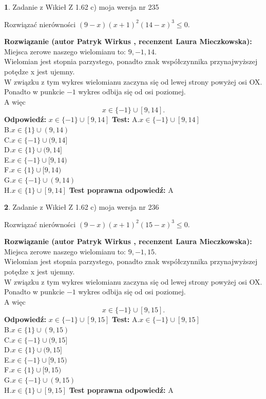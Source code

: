 \documentclass[12pt, a4paper]{article}
\theoremstyle{definition} %
\newtheorem{zad}{}
\newcommand{\zadStart}[1]{\begin{zad}#1\newline}
\newcommand{\zadStop}{\end{zad}}
\newcommand{\rozwStart}[2]{\noindent \textbf{Rozwiązanie (autor #1 , recenzent #2): }\newline}
\newcommand{\rozwStop}{\newline}
\newcommand{\odpStart}{\noindent \textbf{Odpowiedź:}\newline}
\newcommand{\odpStop}{\newline}
\newcommand{\testStart}{\noindent \textbf{Test:}\newline}
\newcommand{\testStop}{\newline}
\newcommand{\kluczStart}{\noindent \textbf{Test poprawna odpowiedź:}\newline}
\newcommand{\kluczStop}{\newline}
\begin{document}
\zadStart{Zadanie z Wikieł Z 1.62 c) moja wersja nr 235}

Rozwiązać nierówności $(9-x)(x+1)^{2}(14-x)^{3}\le0$.
\zadStop
\rozwStart{Patryk Wirkus}{Laura Mieczkowska}
Miejsca zerowe naszego wielomianu to: $9, -1, 14$.\\
Wielomian jest stopnia parzystego, ponadto znak współczynnika przy\linebreak najwyższej potędze x jest ujemny.\\ W związku z tym wykres wielomianu zaczyna się od lewej strony powyżej osi OX.\\
Ponadto w punkcie $-1$ wykres odbija się od osi poziomej.\\
A więc $$x \in \{-1\} \cup [9,14].$$
\rozwStop
\odpStart
$x \in \{-1\} \cup [9,14]$
\odpStop
\testStart
A.$x \in \{-1\} \cup [9,14]$\\
B.$x \in \{1\} \cup (9,14)$\\
C.$x \in \{-1\} \cup (9,14]$\\
D.$x \in \{1\} \cup (9,14]$\\
E.$x \in \{-1\} \cup [9,14)$\\
F.$x \in \{1\} \cup [9,14)$\\
G.$x \in \{-1\} \cup (9,14)$\\
H.$x \in \{1\} \cup [9,14]$
\testStop
\kluczStart
A
\kluczStop



\zadStart{Zadanie z Wikieł Z 1.62 c) moja wersja nr 236}

Rozwiązać nierówności $(9-x)(x+1)^{2}(15-x)^{3}\le0$.
\zadStop
\rozwStart{Patryk Wirkus}{Laura Mieczkowska}
Miejsca zerowe naszego wielomianu to: $9, -1, 15$.\\
Wielomian jest stopnia parzystego, ponadto znak współczynnika przy\linebreak najwyższej potędze x jest ujemny.\\ W związku z tym wykres wielomianu zaczyna się od lewej strony powyżej osi OX.\\
Ponadto w punkcie $-1$ wykres odbija się od osi poziomej.\\
A więc $$x \in \{-1\} \cup [9,15].$$
\rozwStop
\odpStart
$x \in \{-1\} \cup [9,15]$
\odpStop
\testStart
A.$x \in \{-1\} \cup [9,15]$\\
B.$x \in \{1\} \cup (9,15)$\\
C.$x \in \{-1\} \cup (9,15]$\\
D.$x \in \{1\} \cup (9,15]$\\
E.$x \in \{-1\} \cup [9,15)$\\
F.$x \in \{1\} \cup [9,15)$\\
G.$x \in \{-1\} \cup (9,15)$\\
H.$x \in \{1\} \cup [9,15]$
\testStop
\kluczStart
A
\kluczStop
\end{document}

